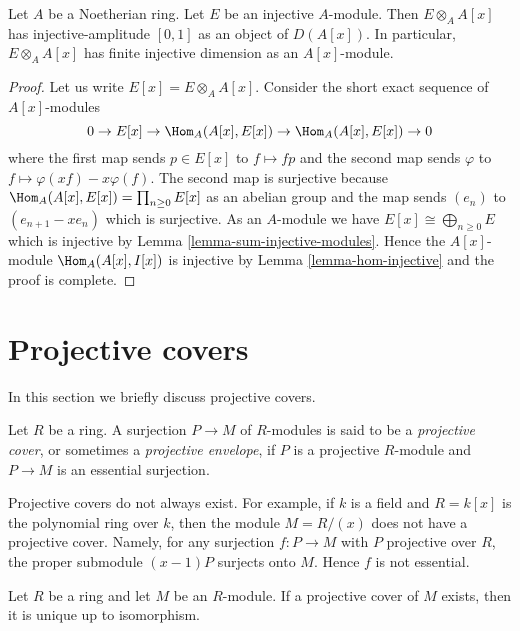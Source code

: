 \begin{lemma}
\label{lemma-injective-dimension-over-polynomial-ring}
Let $A$ be a Noetherian ring. Let $E$ be an injective $A$-module.
Then $E \otimes_A A[x]$ has injective-amplitude $[0, 1]$
as an object of $D(A[x])$. In particular, $E \otimes_A A[x]$
has finite injective dimension as an $A[x]$-module.
\end{lemma}

\begin{proof}
Let us write $E[x] = E \otimes_A A[x]$. Consider the short exact
sequence of $A[x]$-modules
$$
0 \to E[x] \to \Hom_A(A[x], E[x]) \to \Hom_A(A[x], E[x]) \to 0
$$
where the first map sends $p \in E[x]$ to $f \mapsto fp$ and the
second map sends $\varphi$ to $f \mapsto \varphi(xf) - x\varphi(f)$.
The second map is surjective because
$\Hom_A(A[x], E[x]) = \prod_{n \geq 0} E[x]$ as an abelian group and
the map sends $(e_n)$ to $(e_{n + 1} - xe_n)$ which is surjective.
As an $A$-module we have $E[x] \cong \bigoplus_{n \geq 0} E$
which is injective by Lemma \ref{lemma-sum-injective-modules}.
Hence the $A[x]$-module $\Hom_A(A[x], I[x])$ is injective by
Lemma \ref{lemma-hom-injective} and the proof is complete.
\end{proof}



\section{Projective covers}
\label{section-projective-cover}

\noindent
In this section we briefly discuss projective covers.

\begin{definition}
\label{definition-projective-cover}
Let $R$ be a ring. A surjection $P \to M$ of $R$-modules is said
to be a {\it projective cover}, or sometimes a {\it projective envelope},
if $P$ is a projective $R$-module and $P \to M$ is an essential
surjection.
\end{definition}

\noindent
Projective covers do not always exist. For example, if $k$ is a field
and $R = k[x]$ is the polynomial ring over $k$, then the module $M = R/(x)$
does not have a projective cover. Namely, for any surjection $f : P \to M$
with $P$ projective over $R$, the proper submodule $(x - 1)P$ surjects
onto $M$. Hence $f$ is not essential.

\begin{lemma}
\label{lemma-projective-cover-unique}
Let $R$ be a ring and let $M$ be an $R$-module. If a projective cover
of $M$ exists, then it is unique up to isomorphism.
\end{lemma}

